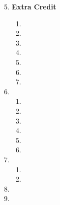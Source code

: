 \begin{enumerate}
    \setcounter{enumi}{4}

  \item \textbf{Extra Credit}

    \begin{enumerate}

      \item 

      \item 

      \item 

      \item 

      \item 

      \item 

      \item 

    \end{enumerate}

  \item

    \begin{enumerate}

      \item 

      \item 

      \item 

      \item 

      \item 

      \item 

    \end{enumerate}

  \item

    \begin{enumerate}

      \item 

      \item 

    \end{enumerate}

  \item

  \item

\end{enumerate}




